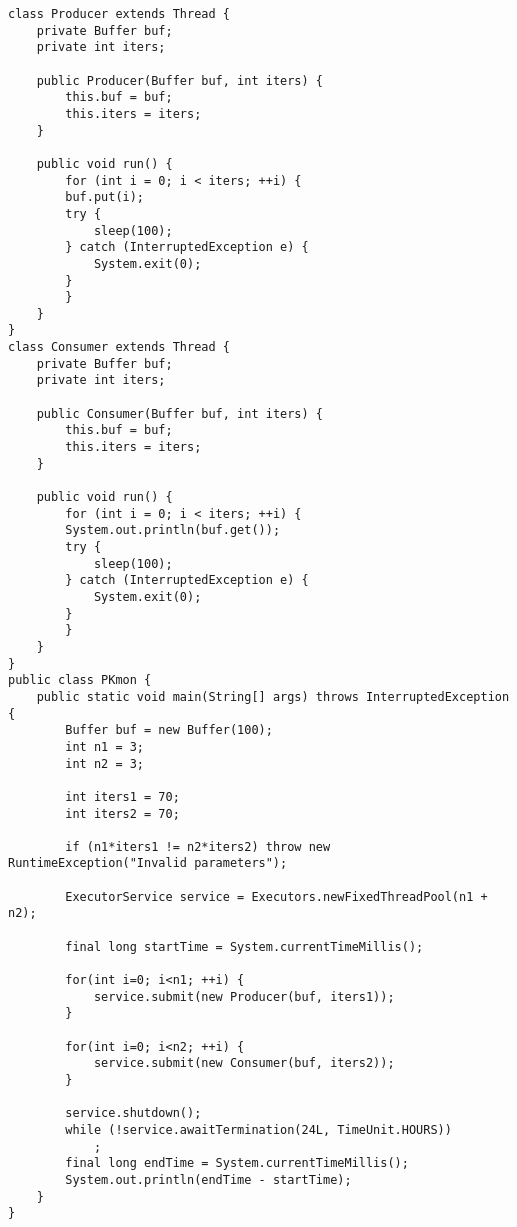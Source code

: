 \documentclass{article}
\begin{document}
\begin{verbatim}
class Producer extends Thread {
    private Buffer buf;
    private int iters;

    public Producer(Buffer buf, int iters) {
        this.buf = buf;
        this.iters = iters;
    }

    public void run() {
        for (int i = 0; i < iters; ++i) {
        buf.put(i);
        try {
            sleep(100);
        } catch (InterruptedException e) {
            System.exit(0);
        }
        }
    }
}   
class Consumer extends Thread {
    private Buffer buf;
    private int iters;

    public Consumer(Buffer buf, int iters) {
        this.buf = buf;
        this.iters = iters;
    }

    public void run() {
        for (int i = 0; i < iters; ++i) {
        System.out.println(buf.get());
        try {
            sleep(100);
        } catch (InterruptedException e) {
            System.exit(0);
        }
        }
    }
}
public class PKmon {    
    public static void main(String[] args) throws InterruptedException {
        Buffer buf = new Buffer(100);
        int n1 = 3;
        int n2 = 3;

        int iters1 = 70;
        int iters2 = 70;

        if (n1*iters1 != n2*iters2) throw new RuntimeException("Invalid parameters");

        ExecutorService service = Executors.newFixedThreadPool(n1 + n2);

        final long startTime = System.currentTimeMillis();

        for(int i=0; i<n1; ++i) {
            service.submit(new Producer(buf, iters1));
        }

        for(int i=0; i<n2; ++i) {
            service.submit(new Consumer(buf, iters2));
        }

        service.shutdown();
        while (!service.awaitTermination(24L, TimeUnit.HOURS)) 
            ;
        final long endTime = System.currentTimeMillis();
        System.out.println(endTime - startTime);
    }
}
\end{verbatim}
\end{document}
